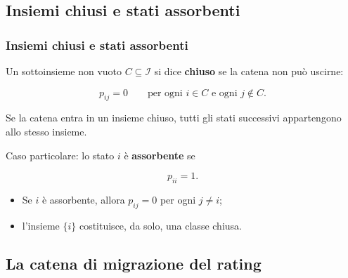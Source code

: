 \documentclass[handout]{beamer}%
\newenvironment{stepitemize}{\begin{itemize}[<+->]}{\end{itemize} }
\providecommand{\QTR}[2]{\csname #1\endcsname{#2}}
\begin{document}


\subsection{Insiemi chiusi e stati assorbenti}%

\begin{frame}%
%

\frametitle{Insiemi chiusi e stati assorbenti}%
%

%


Un sottoinsieme non vuoto $C\subseteq\mathcal{I}$ si dice \textbf{chiuso} se
la catena non pu\`{o} uscirne:%

\[
p_{ij}=0 \qquad\text{per ogni }i\in C \text{ e ogni }j\notin C.
\]


Se la catena entra in un insieme chiuso, tutti gli stati successivi
appartengono allo stesso insieme.

\medskip

Caso particolare: lo stato $i$ \`{e} \textbf{assorbente} se%

\[
p_{ii}=1.
\]


\medskip

\begin{stepitemize}
\item Se $i$ \`{e} assorbente, allora $p_{ij}=0$ per ogni $j\neq i$;

\item l'insieme $\{i\}$ costituisce, da solo, una classe chiusa.
\end{stepitemize}%

\transboxout
\end{frame}%




\subsection{La catena di migrazione del rating}%
\end{document}

